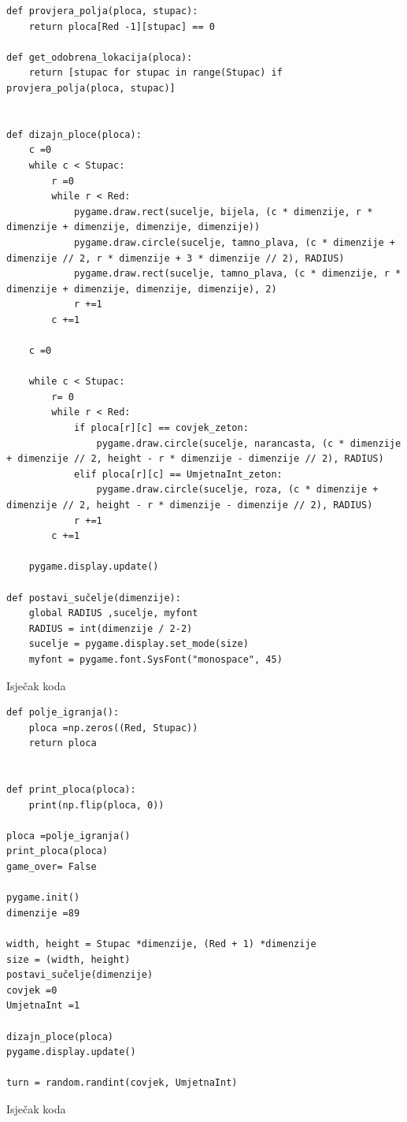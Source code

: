 \documentclass[]{foi}
\begin{document}
\begin{listing}
    \begin{verbatim}
def provjera_polja(ploca, stupac):
    return ploca[Red -1][stupac] == 0

def get_odobrena_lokacija(ploca):
    return [stupac for stupac in range(Stupac) if provjera_polja(ploca, stupac)]


def dizajn_ploce(ploca):
    c =0
    while c < Stupac:
        r =0
        while r < Red:
            pygame.draw.rect(sucelje, bijela, (c * dimenzije, r * dimenzije + dimenzije, dimenzije, dimenzije))
            pygame.draw.circle(sucelje, tamno_plava, (c * dimenzije + dimenzije // 2, r * dimenzije + 3 * dimenzije // 2), RADIUS)
            pygame.draw.rect(sucelje, tamno_plava, (c * dimenzije, r * dimenzije + dimenzije, dimenzije, dimenzije), 2)
            r +=1
        c +=1

    c =0
    
    while c < Stupac:
        r= 0
        while r < Red:
            if ploca[r][c] == covjek_zeton:
                pygame.draw.circle(sucelje, narancasta, (c * dimenzije + dimenzije // 2, height - r * dimenzije - dimenzije // 2), RADIUS)
            elif ploca[r][c] == UmjetnaInt_zeton:
                pygame.draw.circle(sucelje, roza, (c * dimenzije + dimenzije // 2, height - r * dimenzije - dimenzije // 2), RADIUS)
            r +=1
        c +=1

    pygame.display.update()

def postavi_sučelje(dimenzije):
    global RADIUS ,sucelje, myfont
    RADIUS = int(dimenzije / 2-2)
    sucelje = pygame.display.set_mode(size)
    myfont = pygame.font.SysFont("monospace", 45)
    \end{verbatim}
    \caption{Isječak koda}
    \label{lst:dva}
\end{listing}

\begin{listing}
    \begin{verbatim}
def polje_igranja():
    ploca =np.zeros((Red, Stupac))
    return ploca


def print_ploca(ploca):
    print(np.flip(ploca, 0))

ploca =polje_igranja()
print_ploca(ploca)
game_over= False

pygame.init()
dimenzije =89

width, height = Stupac *dimenzije, (Red + 1) *dimenzije
size = (width, height)
postavi_sučelje(dimenzije)
covjek =0
UmjetnaInt =1

dizajn_ploce(ploca)
pygame.display.update()

turn = random.randint(covjek, UmjetnaInt)
    \end{verbatim}
    \caption{Isječak koda}
    \label{lst:dva}
\end{listing}
\end{document}
